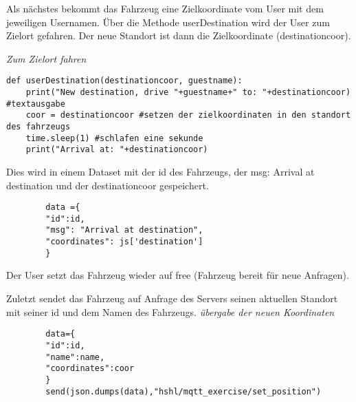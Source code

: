 Als nächstes bekommt das Fahrzeug eine Zielkoordinate vom User mit dem jeweiligen Usernamen.
Über die Methode userDestination wird der User zum Zielort gefahren. Der neue Standort ist dann die Zielkoordinate (destinationcoor).

\newline
\textit{Zum Zielort fahren}
\begin{lstlisting}
def userDestination(destinationcoor, guestname):
    print("New destination, drive "+guestname+" to: "+destinationcoor) #textausgabe
    coor = destinationcoor #setzen der zielkoordinaten in den standort des fahrzeugs
    time.sleep(1) #schlafen eine sekunde
    print("Arrival at: "+destinationcoor)
\end{lstlisting}

Dies wird in einem Dataset mit der id des Fahrzeugs, der msg: Arrival at destination und der destinationcoor gespeichert.

\begin{lstlisting}
        data ={
        "id":id,
        "msg": "Arrival at destination",
        "coordinates": js['destination']
        }
\end{lstlisting}
Der User setzt das Fahrzeug wieder auf free (Fahrzeug bereit für neue Anfragen).


Zuletzt sendet das Fahrzeug auf Anfrage des Servers seinen aktuellen Standort mit seiner id und dem Namen des Fahrzeugs. 
\textit{übergabe der neuen Koordinaten}
\begin{lstlisting}
        data={
        "id":id,
        "name":name,
        "coordinates":coor
        }
        send(json.dumps(data),"hshl/mqtt_exercise/set_position")

\end{lstlisting}




















